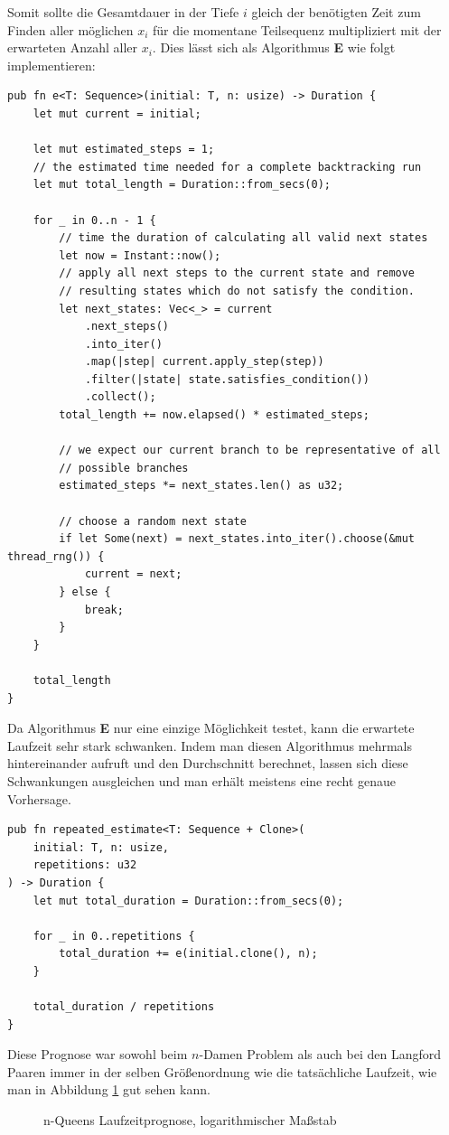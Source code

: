 Somit sollte die Gesamtdauer in der Tiefe $i$ gleich der benötigten Zeit zum Finden aller
möglichen $x_{i}$ für die momentane Teilsequenz multipliziert mit der erwarteten Anzahl aller $x_{i}$.
Dies lässt sich als Algorithmus \textbf{E} wie folgt implementieren:
\begin{verbatim}
pub fn e<T: Sequence>(initial: T, n: usize) -> Duration {
    let mut current = initial;

    let mut estimated_steps = 1;
    // the estimated time needed for a complete backtracking run
    let mut total_length = Duration::from_secs(0);

    for _ in 0..n - 1 {
        // time the duration of calculating all valid next states
        let now = Instant::now();
        // apply all next steps to the current state and remove
        // resulting states which do not satisfy the condition.
        let next_states: Vec<_> = current
            .next_steps()
            .into_iter()
            .map(|step| current.apply_step(step))
            .filter(|state| state.satisfies_condition())
            .collect();
        total_length += now.elapsed() * estimated_steps;

        // we expect our current branch to be representative of all
        // possible branches
        estimated_steps *= next_states.len() as u32;

        // choose a random next state
        if let Some(next) = next_states.into_iter().choose(&mut thread_rng()) {
            current = next;
        } else {
            break;
        }
    }

    total_length
}
\end{verbatim}

Da Algorithmus \textbf{E} nur eine einzige Möglichkeit testet, kann die erwartete Laufzeit
sehr stark schwanken. Indem man diesen Algorithmus mehrmals hintereinander aufruft und
den Durchschnitt berechnet, lassen sich diese Schwankungen ausgleichen und man
erhält meistens eine recht genaue Vorhersage.
\begin{verbatim}
pub fn repeated_estimate<T: Sequence + Clone>(
    initial: T, n: usize,
    repetitions: u32
) -> Duration {
    let mut total_duration = Duration::from_secs(0);

    for _ in 0..repetitions {
        total_duration += e(initial.clone(), n);
    }

    total_duration / repetitions
}
\end{verbatim}
Diese Prognose war sowohl beim $n$-Damen Problem als auch bei den Langford Paaren immer
in der selben Größenordnung wie die tatsächliche Laufzeit, wie man in Abbildung \ref{estimate} gut sehen kann.
\begin{figure}
    \centering
    
    \caption{n-Queens Laufzeitprognose, logarithmischer Maßstab}
    \label{estimate}
  \end{figure}